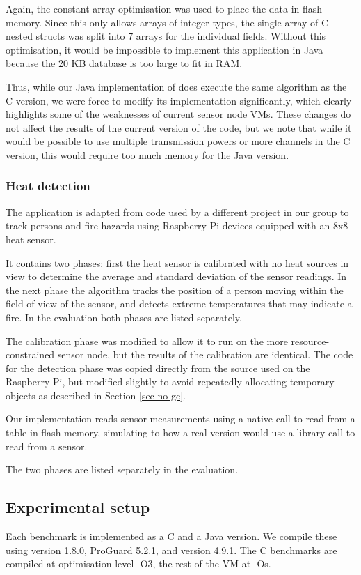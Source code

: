 Again, the constant array optimisation was used to place the data in flash memory. Since this only allows arrays of integer types, the single array of C nested structs was split into 7 arrays for the individual fields. Without this optimisation, it would be impossible to implement this application in Java because the 20 KB database is too large to fit in RAM.

Thus, while our Java implementation of  does execute the same algorithm as the C version, we were force to modify its implementation significantly, which clearly highlights some of the weaknesses of current sensor node VMs. These changes do not affect the results of the current version of the code, but we note that while it would be possible to use multiple transmission powers or more channels in the C version, this would require too much memory for the Java version.

\subsubsection{Heat detection}
The  application is adapted from code used by a different project in our group to track persons and fire hazards using Raspberry Pi devices equipped with an 8x8 heat sensor.

It contains two phases: first the heat sensor is calibrated with no heat sources in view to determine the average and standard deviation of the sensor readings. In the next phase the algorithm tracks the position of a person moving within the field of view of the sensor, and detects extreme temperatures that may indicate a fire. In the evaluation both phases are listed separately.

The calibration phase was modified to allow it to run on the more resource-constrained sensor node, but the results of the calibration are identical. The code for the detection phase was copied directly from the source used on the Raspberry Pi, but modified slightly to avoid repeatedly allocating temporary objects as described in Section \ref{sec-no-gc}.

Our implementation reads sensor measurements using a native call to read from a table in flash memory, simulating to how a real version would use a library call to read from a sensor.

The two phases are listed separately in the evaluation.


\subsection{Experimental setup}
Each benchmark is implemented as a C and a Java version. We compile these using  version 1.8.0, ProGuard 5.2.1, and  version 4.9.1. The C benchmarks are compiled at optimisation level -O3, the rest of the VM at -Os.

